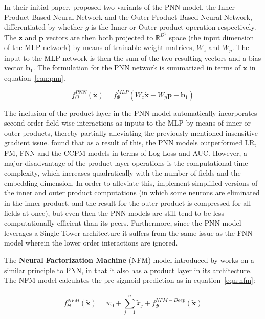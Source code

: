 \documentclass{mldsmsc}
\begin{document}
In their initial paper, \cite{RefWorks:qu2016product-based} proposed two variants of the PNN model, the Inner Product Based Neural Network
and the Outer Product Based Neural Network, differentiated by whether $g$ is the Inner or Outer
product operation respectively. The $\mathbf{z}$ and $\mathbf{p}$ vectors are then both
projected to $\mathbb{R}^{D^1}$ space (the input dimension of the MLP network) by means
of trainable weight matrices, $W_z$ and $W_p$. The input to the MLP network is then the
sum of the two resulting vectors and a bias vector $\mathbf{b}_1$. The formulation
for the PNN network is summarized in terms of $\dot{\mathbf{x}}$ in equation~\ref{eqn:pnn}.

\begin{equation}\label{eqn:pnn}
    f_{\Theta}^{PNN}(\dot{\mathbf{x}}) = f_{\Phi}^{MLP}(W_z \dot{\mathbf{x}} + W_p \mathbf{p} + \mathbf{b}_1)
\end{equation}

The inclusion of the product layer in the PNN model automatically incorporates second order field-wise
interactions as inputs to the MLP by means of inner or outer products, thereby partially alleviating
the previously mentioned insensitive gradient issue. \cite{RefWorks:qu2016product-based} found that
as a result of this, the PNN models outperformed LR, FM, FNN and the CCPM models in terms of Log Loss
and AUC. However, a major disadvantage of the product layer operations is the computational time complexity,
which increases quadratically with the number of fields and the embedding dimension. In order to alleviate
this, \cite{RefWorks:qu2016product-based} implement simplified versions of the inner and outer product
computations (in which some neurons are eliminated in the inner product, and the result for the outer product
is compressed for all fields at once), but even then the PNN models are still tend to be less computationally efficient
than its peers. Furthermore, since the PNN model leverages a Single Tower architecture it suffers from the
same issue as the FNN model wherein the lower order interactions are ignored.

The \textbf{Neural Factorization Machine} (NFM) model introduced by \cite{RefWorks:he2017neural} works
on a similar principle to PNN, in that it also has a product layer in
its architecture. The NFM model calculates the pre-sigmoid prediction as
in equation~\ref{eqn:nfm}:

\begin{equation}
    \label{eqn:nfm}
    f_{\Theta}^{NFM}(\tilde{\mathbf{x}}) = w_0 + \sum_{j=1}^{\tilde{n}} \tilde{x}_j
    + f_{\Phi}^{NFM-Deep}(\tilde{\mathbf{x}})
\end{equation}
\end{document}

